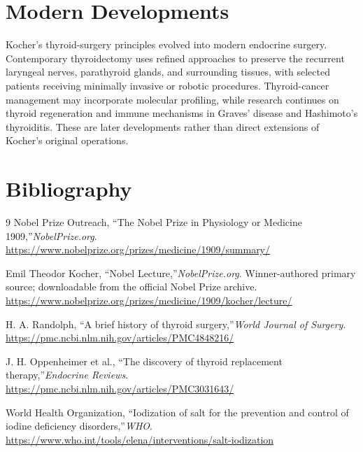 \section{Modern Developments}

Kocher's thyroid-surgery principles evolved into modern endocrine surgery. Contemporary thyroidectomy uses refined approaches to preserve the recurrent laryngeal nerves, parathyroid glands, and surrounding tissues, with selected patients receiving minimally invasive or robotic procedures. Thyroid-cancer management may incorporate molecular profiling, while research continues on thyroid regeneration and immune mechanisms in Graves' disease and Hashimoto's thyroiditis. These are later developments rather than direct extensions of Kocher's original operations.


\section{Bibliography}

\begin{thebibliography}{9}
Nobel Prize Outreach, ``The Nobel Prize in Physiology or Medicine 1909,''\emph{NobelPrize.org}.\\
\url{https://www.nobelprize.org/prizes/medicine/1909/summary/}

Emil Theodor Kocher, ``Nobel Lecture,''\emph{NobelPrize.org}. Winner-authored primary source; downloadable from the official Nobel Prize archive.\\
\url{https://www.nobelprize.org/prizes/medicine/1909/kocher/lecture/}

H. A. Randolph, ``A brief history of thyroid surgery,''\emph{World Journal of Surgery}.\\
\url{https://pmc.ncbi.nlm.nih.gov/articles/PMC4848216/}

J. H. Oppenheimer et al., ``The discovery of thyroid replacement therapy,''\emph{Endocrine Reviews}.\\
\url{https://pmc.ncbi.nlm.nih.gov/articles/PMC3031643/}

World Health Organization, ``Iodization of salt for the prevention and control of iodine deficiency disorders,''\emph{WHO}.\\
\url{https://www.who.int/tools/elena/interventions/salt-iodization}
\end{thebibliography}
